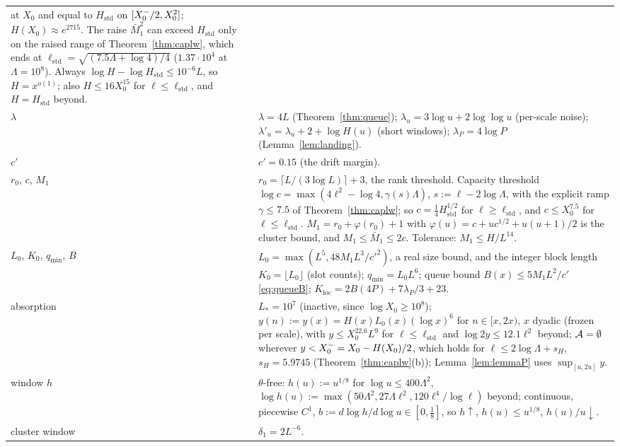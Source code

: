 \begin{center}
\begin{tabular}{@{}p{2.1cm}p{12.4cm}@{}}
at $X_0$ and equal to $H_{\mathrm{std}}$ on $[X_0^{-}/2,X_0^2]$; $H(X_0)\approx e^{2715}$. The raise $\bar M_1^2$
can exceed $H_{\mathrm{std}}$ only on the raised range of Theorem~\ref{thm:caplw}, which ends at
$\ell_{\mathrm{std}}=\sqrt{(7.5\Lambda+\log4)/4}$ ($1.37\cdot10^4$ at $\Lambda=10^8$). Always $\log H-\log H_{\mathrm{std}}\le10^{-6}L$,
so $H=x^{o(1)}$; also $H\le16X_0^{15}$ for $\ell\le\ell_{\mathrm{std}}$, and $H=H_{\mathrm{std}}$ beyond. \\
$\lambda$ & $\lambda=4L$ (Theorem~\ref{thm:queue}); $\lambda_u=3\log u+2\log\log u$ (per-scale noise);
$\lambda'_u=\lambda_u+2+\log H(u)$ (short windows); $\lambda_P=4\log P$ (Lemma~\ref{lem:landing}). \\
$c'$ & $c'=0.15$ (the drift margin). \\
$r_0$, $c$, $M_1$ & $r_0=\lceil L/(3\log L)\rceil+3$, the rank threshold. Capacity threshold $\log c=\max(4\ell^2-\log4,\gamma(s)\Lambda)$,
$s:=\ell-2\log\Lambda$, with the explicit ramp $\gamma\le7.5$ of Theorem~\ref{thm:caplw}; so $c=\tfrac14H_{\mathrm{std}}^{1/2}$ for
$\ell\ge\ell_{\mathrm{std}}$, and $c\le X_0^{7.5}$ for $\ell\le\ell_{\mathrm{std}}$. $M_1=r_0+\varphi(r_0)+1$ with $\varphi(u)=c+uc^{1/2}+u(u+1)/2$ is
the cluster bound, and $M_1\le\bar M_1\le2c$. Tolerance: $M_1\le H/L^{14}$. \\
$L_0$, $K_0$, $q_{\min}$, $B$ & $L_0=\max(L^5,48M_1L^3/c'^2)$, a real size bound, and the integer block length
$K_0=\lfloor L_0\rfloor$ (slot counts); $q_{\min}=L_0L^6$; queue bound $B(x)\le5M_1L^2/c'$ \eqref{eq:queueB};
$K_{\mathrm{loc}}=2B(4P)+7\lambda_P/3+23$. \\
absorption & $L_*=10^7$ (inactive, since $\log X_0\ge10^8$); $y(n):=y(x)=H(x)L_0(x)(\log x)^6$ for $n\in[x,2x)$, $x$ dyadic (frozen per scale), with $y\le X_0^{22.6}L^9$ for $\ell\le\ell_{\mathrm{std}}$ and $\log2y\le12.1\ell^2$ beyond; $\mathcal{A}=\emptyset$ wherever
$y<X_0^{-}=X_0-H(X_0)/2$, which holds for $\ell\le2\log\Lambda+s_H$, $s_H=5.9745$ (Theorem~\ref{thm:caplw}(b)); Lemma~\ref{lem:lemmaP} uses $\sup_{[u,2u]}y$. \\
window $h$ & $\theta$-free: $h(u):=u^{1/8}$ for $\log u\le400\Lambda^2$, $\log h(u):=\max(50\Lambda^2,27\Lambda\ell^2,120\ell^4/\log\ell)$
beyond; continuous, piecewise $C^1$, $b:=d\log h/d\log u\in[0,\tfrac18]$, so $h\uparrow$, $h(u)\le u^{1/8}$, $h(u)/u\downarrow$. \\
cluster window & $\delta_1=2L^{-6}$. \\

\end{tabular}
\end{center}
